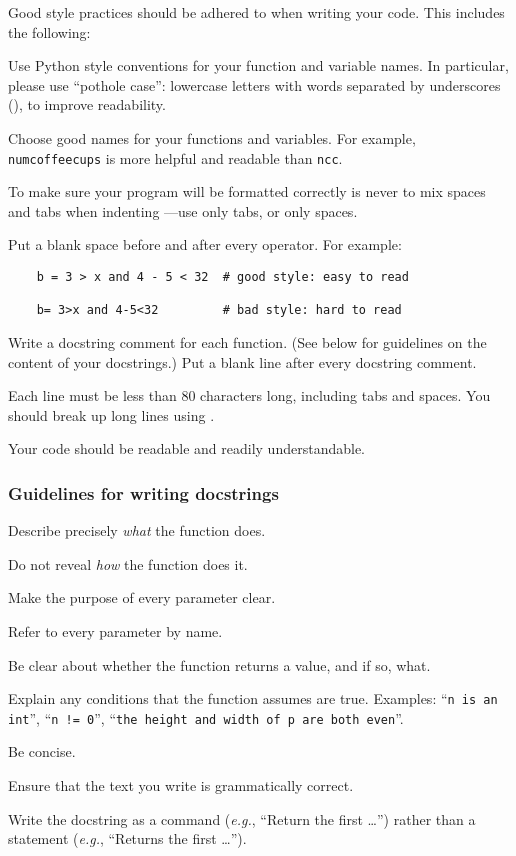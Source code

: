 \documentclass[11pt]{article}
\let\code\texttt
\let\latinabb\emph
\newcommand*{\eg}{\latinabb{e.g.}}
\newcommand*{\txtbksl} {\symbol{"5C}}%
\newcommand*{\txtunder}{\symbol{"5F}}%
\let\ezimeti\itemize
\let\ezimetidne\enditemize
\renewenvironment{itemize}
   {\ezimeti
    \setlength{\topsep}{.25ex plus .125ex minus .1825ex}%
    \setlength{\itemsep}{\topsep}\setlength{\parsep}{0ex}%
    \setlength{\leftmargin}{1.75em}\setlength{\labelsep}{.5em}%
    \setlength{\labelwidth}{1.75em}\ignorespaces}
   {\ezimetidne}
\newcommand*{\heading}[1]{\subsubsection*{#1}}
\begin{document}
Good style practices should be adhered to when writing your code.  This 
includes the following:
\begin{itemize}
\item
    Use Python style conventions for your function and variable names.  In 
    particular, please use ``pothole case'': lowercase letters with words 
    separated by underscores (\code{\txtunder}), to improve readability.
\item
    Choose good names for your functions and variables.  For example, 
    \code{num\txtunder coffee\txtunder cups} is more helpful and readable 
    than \code{ncc}.
\item
    To make sure your program will be formatted correctly is never 
    to mix spaces and tabs when indenting ---use only tabs, or only spaces.
\item
    Put a blank space before and after every operator.  For example:
\begin{verbatim}
    b = 3 > x and 4 - 5 < 32  # good style: easy to read
    
    b= 3>x and 4-5<32         # bad style: hard to read
\end{verbatim}
\item
    Write a docstring comment for each function.  (See below for guidelines 
    on the content of your docstrings.) 
    Put a blank line after every docstring comment.
\item
    Each line must be less than 80 characters long, including tabs and 
    spaces.  You should break up long lines using \code{\txtbksl}. 
\item
    Your code should be readable and readily understandable.
\end{itemize}

\heading{Guidelines for writing docstrings}

\begin{itemize}
\item  Describe precisely \emph{what} the function does.
\item  Do not reveal \emph{how} the function does it.
\item  Make the purpose of every parameter clear.
\item  Refer to every parameter by name.
\item  Be clear about whether the function returns a value, and if so, 
    what.
\item  Explain any conditions that the function assumes are true.  
    Examples: ``\code{n is an int}'', ``\verb|n != 0|'', ``\code{the height 
    and width of p are both even}''.
\item  Be concise.
\item  Ensure that the text you write is grammatically correct.
\item  Write the docstring as a command (\eg, ``Return the first \ldots'') 
    rather than a statement (\eg, ``Returns the first \ldots'').
\end{itemize}
\end{document}
